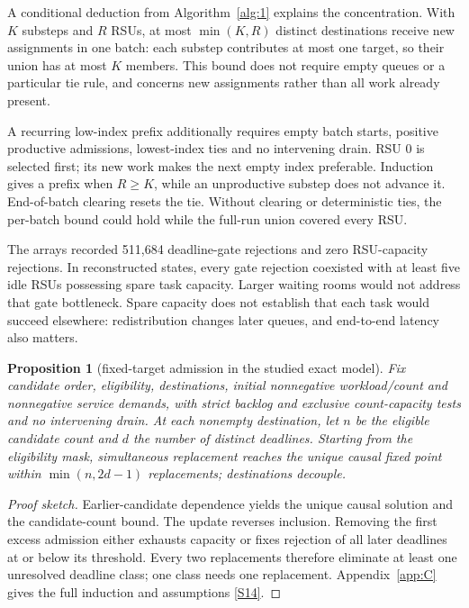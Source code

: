 \documentclass[11pt,a4paper]{article}
\newtheorem{proposition}{Proposition}
\begin{document}
A conditional deduction from Algorithm~\ref{alg:1} explains the concentration. With $K$ substeps and $R$ RSUs, at most $\min(K,R)$ distinct destinations receive new assignments in one batch: each substep contributes at most one target, so their union has at most $K$ members. This bound does not require empty queues or a particular tie rule, and concerns new assignments rather than all work already present.

A recurring low-index prefix additionally requires empty batch starts, positive productive admissions, lowest-index ties and no intervening drain. RSU 0 is selected first; its new work makes the next empty index preferable. Induction gives a prefix when $R\geq K$, while an unproductive substep does not advance it. End-of-batch clearing resets the tie. Without clearing or deterministic ties, the per-batch bound could hold while the full-run union covered every RSU.

The arrays recorded 511,684 deadline-gate rejections and zero RSU-capacity rejections. In reconstructed states, every gate rejection coexisted with at least five idle RSUs possessing spare task capacity. Larger waiting rooms would not address that gate bottleneck. Spare capacity does not establish that each task would succeed elsewhere: redistribution changes later queues, and end-to-end latency also matters.

\begin{proposition}[fixed-target admission in the studied exact model]\label{prop:1}
Fix candidate order, eligibility, destinations, initial nonnegative workload/count and nonnegative service demands, with strict backlog and exclusive count-capacity tests and no intervening drain. At each nonempty destination, let $n$ be the eligible candidate count and $d$ the number of distinct deadlines. Starting from the eligibility mask, simultaneous replacement reaches the unique causal fixed point within $\min(n,2d-1)$ replacements; destinations decouple.\end{proposition}

\begin{proof}[Proof sketch]
Earlier-candidate dependence yields the unique causal solution and the candidate-count bound. The update reverses inclusion. Removing the first excess admission either exhausts capacity or fixes rejection of all later deadlines at or below its threshold. Every two replacements therefore eliminate at least one unresolved deadline class; one class needs one replacement. Appendix~\ref{app:C} gives the full induction and assumptions \hyperref[source-s14]{[S14]}.\end{proof}
\end{document}
